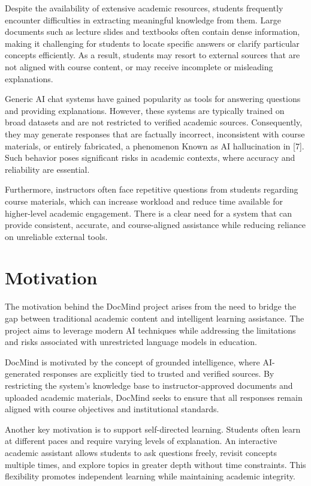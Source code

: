 \documentclass[12pt, a4paper, oneside]{report}
\let\oldsection\section
\renewcommand{\section}{%
  \addtocontents{toc}{\protect\needspace{4\baselineskip}}%
  \oldsection
}
\begin{document}
Despite the availability of extensive academic resources, students frequently encounter difficulties in extracting meaningful knowledge from them. Large documents such as lecture slides and textbooks often contain dense information, making it challenging for students to locate specific answers or clarify particular concepts efficiently. As a result, students may resort to external sources that are not aligned with course content, or may receive incomplete or misleading explanations.

Generic AI chat systems have gained popularity as tools for answering questions and providing explanations. However, these systems are typically trained on broad datasets and are not restricted to verified academic sources. Consequently, they may generate responses that are factually incorrect, inconsistent with course materials, or entirely fabricated, a phenomenon Known as AI hallucination in [7]. Such behavior poses significant risks in academic contexts, where accuracy and reliability are essential.

Furthermore, instructors often face repetitive questions from students regarding course materials, which can increase workload and reduce time available for higher-level academic engagement. There is a clear need for a system that can provide consistent, accurate, and course-aligned assistance while reducing reliance on unreliable external tools.

\section{Motivation}

The motivation behind the DocMind project arises from the need to bridge the gap between traditional academic content and intelligent learning assistance. The project aims to leverage modern AI techniques while addressing the limitations and risks associated with unrestricted language models in education.

DocMind is motivated by the concept of grounded intelligence, where AI-generated responses are explicitly tied to trusted and verified sources. By restricting the system's knowledge base to instructor-approved documents and uploaded academic materials, DocMind seeks to ensure that all responses remain aligned with course objectives and institutional standards.

Another key motivation is to support self-directed learning. Students often learn at different paces and require varying levels of explanation. An interactive academic assistant allows students to ask questions freely, revisit concepts multiple times, and explore topics in greater depth without time constraints. This flexibility promotes independent learning while maintaining academic integrity.
\end{document}
